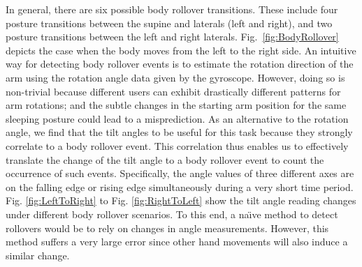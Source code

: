 In general, there are six possible body rollover transitions. These include four posture transitions between the supine and laterals (left
and right), and two posture transitions between the left and right laterals. Fig.~\ref{fig:BodyRollover} depicts the case when the body
moves from the left to the right side. An intuitive way for detecting body rollover events is to estimate the rotation direction of the arm
using the rotation angle data given by the gyroscope. However, doing so is non-trivial because different users can exhibit drastically
different patterns for arm rotations; and the subtle changes in the starting arm position for the same sleeping posture could lead to a
misprediction. As an alternative to the rotation angle, we find that the tilt angles to be useful for this task because they strongly
correlate to a body rollover event. This correlation thus enables us to effectively translate the change of the tilt angle to a body
rollover event to count the occurrence of such events. Specifically, the angle values of three different axes are on the falling edge or
rising edge simultaneously during a very short time period. Fig. \ref{fig:LeftToRight} to Fig. \ref{fig:RightToLeft} show the tilt angle
reading changes under different body rollover scenarios. To this end, a na\"{\i}ve method to detect rollovers would be to rely on changes
in angle measurements. However, this method suffers a very large error since other hand movements will also induce a similar change.

